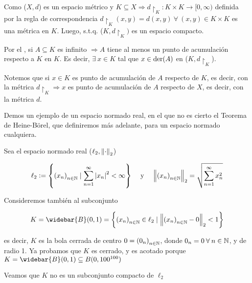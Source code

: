 \begin{orangeproof}
    Como ($X,d$) es un espacio métrico y $K \subseteq X \Rightarrow d \restriction_K : K \times K \to [0,\infty)$ definida por la regla de correspondencia $d \restriction_K (x,y) = d(x,y) \: \forall \: (x,y) \in K \times K$ es una métrica en $K$. Luego, s.t.q. ($K,d \restriction_K)$ es un espacio compacto. 

    Por el , si $A \subseteq K$ es infinito $\Rightarrow A$ tiene al menos un punto de acumulación respecto a $K$ en $K$. Es decir, $\exists \: x \in K$ tal que $x \in \mathrm{der}(A)$ en ($K,d\restriction_K$).

    Notemos que si $x \in K$ es punto de acumulación de $A$ respecto de $K$, es decir, con la métrica $d \restriction_K \Rightarrow x$ es punto de acumulación de $A$ respecto de $X$, es decir, con la métrica $d$.
\end{orangeproof}

\begin{eg}
    Demos un ejemplo de un espacio normado real, en el que no es cierto el Teorema de Heine-Börel, que definiremos más adelante, para un espacio normado cualquiera.

    Sea el espacio normado real ($\ell_2, \norm{\cdot}_2$)

    \begin{align*}
       \ell_2 := \left\{ {(x_n)}_{n \in \mathbb{N}} \mid \sum_{n=1}^{\infty} {\abs{x_n}}^{2} < \infty \right\} && \text{ y } && \norm{{(x_n)}_{n \in \mathbb{N}}}_2 = \sqrt{\sum_{n=1}^{\infty} {x}_{n}^{2}}
    \end{align*}

    Consideremos también al subconjunto 

    $$K = \widebar{B}(0,1) = \left\{ {(x_n)}_{n \in \N} \in \ell_2 \mid \norm{{(x_n)}_{n \in \N}-0}_2 < 1 \right\} $$

    es decir, $K$ es la bola cerrada de centro $0 = {(0_n)}_{n \in \mathbb{N}}$, donde $0_n = 0 \: \forall \: n \in \mathbb{N}$,  y de radio 1. Ya probamos que $K$ es cerrado, y es acotado porque $K = \widebar{B}(0,1) \subseteq B(0,100^{100})$

    Veamos que $K$ no es un subconjunto compacto de $\ell_2$
\end{eg}

